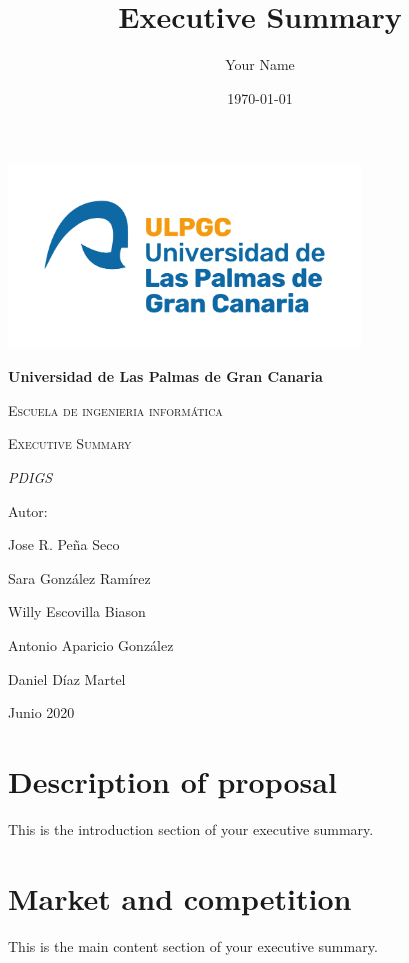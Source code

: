 \documentclass{article}
\begin{document}
\title{Executive Summary}
\author{Your Name}
\date{\today}

\begin{titlepage}
    \centering
    {\includegraphics[width=0.7\textwidth]{logo}\par}
    \vspace{1cm}
    {\bfseries\LARGE Universidad de Las Palmas de Gran Canaria \par}
    \vspace{1cm}
    {\scshape\Large Escuela de ingenieria informática \par}
    \vspace{1cm}
    {\scshape\Huge Executive Summary \par}
    \vspace{1cm}
    {\itshape\Large PDIGS \par}
    \vfill
    {\Large Autor: \par}
    {\Large Jose R. Peña Seco \par}
    {\Large Sara González Ramírez \par}
    {\Large Willy Escovilla Biason \par}
    {\Large Antonio Aparicio González \par}
    {\Large Daniel Díaz Martel  \par}
    \vfill
    {\Large Junio 2020 \par}
    \end{titlepage}
    \newpage
    \newpage


\tableofcontents

\newpage

\section{Description of proposal}
This is the introduction section of your executive summary.

\newpage

\section{Market and competition}
This is the main content section of your executive summary.
\end{document}
